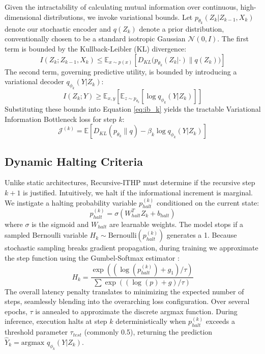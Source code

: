 \documentclass[11pt]{article}
\begin{document}
Given the intractability of calculating mutual information over continuous, high-dimensional distributions, we invoke variational bounds. Let $p_{\theta_k}(Z_k | Z_{k-1}, X_k)$ denote our stochastic encoder and $q(Z_k)$ denote a prior distribution, conventionally chosen to be a standard isotropic Gaussian $\mathcal{N}(0, I)$. The first term is bounded by the Kullback-Leibler (KL) divergence:
\begin{equation}
    I(Z_k ; Z_{k-1}, X_k) \leq \mathbb{E}_{x \sim p(x)} \left[ D_{KL} \big( p_{\theta_k}(Z_k | \cdot) \parallel q(Z_k) \big) \right]
\end{equation}
The second term, governing predictive utility, is bounded by introducing a variational decoder $q_{\phi_k}(Y | Z_k)$:
\begin{equation}
    I(Z_k ; Y) \geq \mathbb{E}_{x, y} \left[ \mathbb{E}_{z \sim p_{\theta_k}} [ \log q_{\phi_k}(Y | Z_k) ] \right]
\end{equation}
Substituting these bounds into Equation \ref{eq:ib_k} yields the tractable Variational Information Bottleneck loss for step $k$:
\begin{equation}
\label{eq:vib_tractable}
    \mathcal{J}^{(k)} = \mathbb{E} \left[ D_{KL}(p_{\theta_k} \parallel q) - \beta_k \log q_{\phi_k}(Y | Z_k) \right]
\end{equation}


\subsection{Dynamic Halting Criteria}
Unlike static architectures, Recursive-ITHP must determine if the recursive step $k+1$ is justified. Intuitively, we halt if the informational increment is marginal. We instigate a halting probability variable $p_{halt}^{(k)}$ conditioned on the current state:
\begin{equation}
    p_{halt}^{(k)} = \sigma(W_{halt}^T Z_k + b_{halt})
\end{equation}
where $\sigma$ is the sigmoid and $W_{halt}$ are learnable weights. The model stops if a sampled Bernoulli variable $H_k \sim \text{Bernoulli}(p_{halt}^{(k)})$ generates a 1.
Because stochastic sampling breaks gradient propagation, during training we approximate the step function using the Gumbel-Softmax estimator \citep{jang2016categorical}:
\begin{equation}
    H_k = \frac{\exp((\log(p_{halt}^{(k)}) + g_1) / \tau)}{\sum \exp((\log(p) + g) / \tau)}
\end{equation}
The overall latency penalty translates to minimizing the expected number of steps, seamlessly blending into the overarching loss configuration. Over several epochs, $\tau$ is annealed to approximate the discrete argmax function.
During inference, execution halts at step $k$ deterministically when $p_{halt}^{(k)}$ exceeds a threshold parameter $\tau_{test}$ (commonly 0.5), returning the prediction $\hat{Y}_k = \text{argmax } q_{\phi_k}(Y | Z_k)$.
\end{document}
